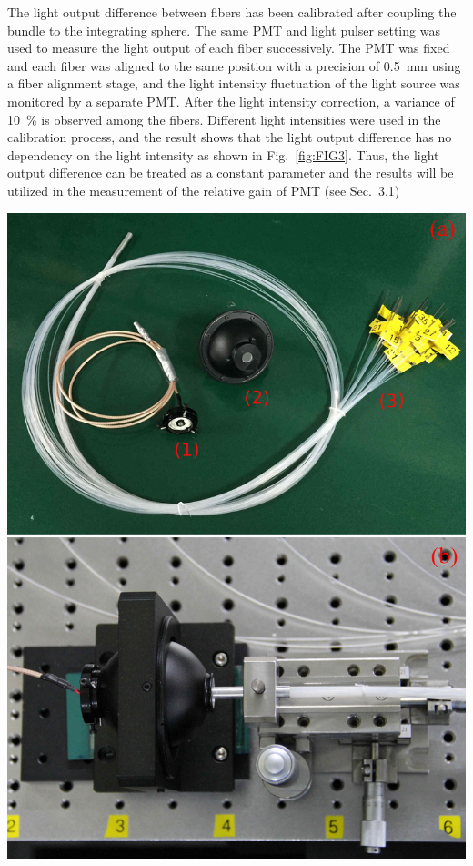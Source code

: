 \documentclass[a4paper,10pt,twoside]{cpc-hepnp}
\begin{document}
\begin{multicols}{2}
The light output difference between fibers has been calibrated after coupling the bundle to the integrating sphere.
The same PMT and light pulser setting was used to measure the light output of each fiber successively.
The PMT was fixed and each fiber was aligned to the same position with a precision of \SI{0.5}{\milli\meter} using a fiber alignment stage, and the light intensity fluctuation of the light source was monitored by a separate PMT.
After the light intensity correction, a variance of \SI{10}{\percent} is observed among the fibers.
Different light intensities were used in the calibration process, and the result shows that the light output difference has no dependency on the light intensity as shown in Fig.~\ref{fig:FIG3}. 
Thus, the light output difference can be treated as a constant parameter and the results will be utilized in the measurement of the relative gain of PMT (see Sec.~3.1)

\begin{center}
	\includegraphics[width=\linewidth]{FIG3}
\end{center} 


\end{multicols}
\end{document}
